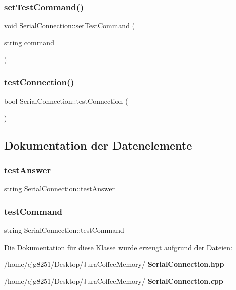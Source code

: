 \mbox{\label{class_serial_connection_a9672748d2a2e36a6e4798a63fb91deff}} 
\subsubsection{set\+Test\+Command()}
{\footnotesize\ttfamily void Serial\+Connection\+::set\+Test\+Command (\begin{DoxyParamCaption}\item[{string}]{command }\end{DoxyParamCaption})}

\mbox{\label{class_serial_connection_a8c19e483a0940911e56869d446a308c4}} 
\subsubsection{test\+Connection()}
{\footnotesize\ttfamily bool Serial\+Connection\+::test\+Connection (\begin{DoxyParamCaption}{ }\end{DoxyParamCaption})}



\subsection{Dokumentation der Datenelemente}
\mbox{\label{class_serial_connection_a2c9c4b1dbfbc044be2d7dcdcc7557d5b}} 
\subsubsection{test\+Answer}
{\footnotesize\ttfamily string Serial\+Connection\+::test\+Answer}

\mbox{\label{class_serial_connection_afd79837648fd9e5b3bc2637112ee05b4}} 
\subsubsection{test\+Command}
{\footnotesize\ttfamily string Serial\+Connection\+::test\+Command}



Die Dokumentation für diese Klasse wurde erzeugt aufgrund der Dateien\+:\begin{DoxyCompactItemize}
\item 
/home/cjg8251/\+Desktop/\+Jura\+Coffee\+Memory/\textbf{ Serial\+Connection.\+hpp}\item 
/home/cjg8251/\+Desktop/\+Jura\+Coffee\+Memory/\textbf{ Serial\+Connection.\+cpp}\end{DoxyCompactItemize}
